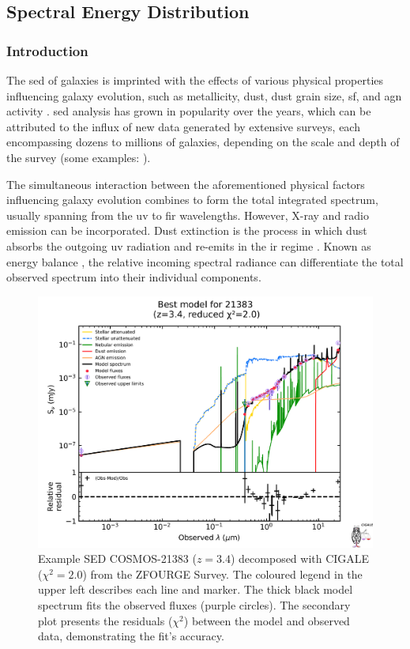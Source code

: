 \subsection{Spectral Energy Distribution} \label{Sec: Spectral Energy Distributions}
\subsubsection{Introduction}
The \gls{sed} of galaxies is imprinted with the effects of various physical properties influencing galaxy evolution, such as metallicity, dust, dust grain size, \gls{sf}, and \gls{agn} activity \citep{conroy_modeling_2013}. \gls{sed} analysis has grown in popularity over the years, which can be attributed to the influx of new data generated by extensive surveys, each encompassing dozens to millions of galaxies, depending on the scale and depth of the survey (some examples: \citealp{lawrence_ukirt_2007, beutler_6df_2011, desi_collaboration_desi_2016, luo_chandra_2017, barlow-hall_constraints_2023, bezanson_jwst_2024}). 

The simultaneous interaction between the aforementioned physical factors influencing galaxy evolution combines to form the total integrated spectrum, usually spanning from the \gls{uv} to \gls{fir} wavelengths. However, X-ray and radio emission can be incorporated. Dust extinction is the process in which dust absorbs the outgoing \gls{uv} radiation and re-emits in the \gls{ir} regime \citep{fu_decomposing_2010, wu_mid-infrared_2011, assef_mid-ir-_2011, han_evolution_2012}. Known as energy balance \citep{smith_panchromatic_2018}, the relative incoming spectral radiance can differentiate the total observed spectrum into their individual components.

\begin{figure}[ht]
    \centering
    \includegraphics[width=\linewidth]{Figures/SED_Example.png}
    \caption{Example SED COSMOS-21383 ($z = 3.4$) decomposed with CIGALE ($\chi^2=2.0$) from the ZFOURGE Survey. The coloured legend in the upper left describes each line and marker. The thick black model spectrum fits the observed fluxes (purple circles). The secondary plot presents the residuals ($\chi^2$) between the model and observed data, demonstrating the fit's accuracy.}
    \label{fig: SED}
\end{figure}

